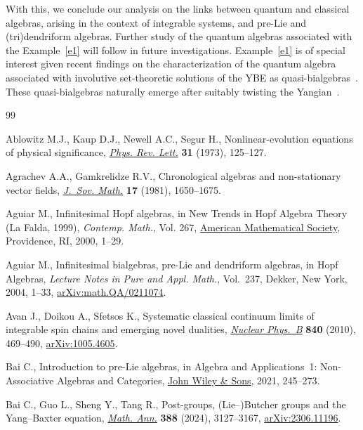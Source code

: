 \documentclass[10pt,a4paper]{amsart}
\numberwithin{equation}{section}
\theoremstyle{definition}
\begin{document}
With this, we conclude our analysis on the links between quantum and classical algebras, arising in the context of integrable systems, and pre-Lie and (tri)dendriform algebras. Further study of the quantum algebras associated with the Example~\ref{e1} will follow in future investigations. Example~\ref{e1} is of special interest given recent findings on the characterization of the quantum algebra associated with involutive set-theoretic solutions of the YBE as quasi-bialgebras~\cite{Doikoutw, DoGhVl}. These quasi-bialgebras naturally emerge after suitably twisting the Yangian~\cite{Doikoutw}.

\begin{thebibliography}{99}
\footnotesize\itemsep=0pt

Ablowitz M.J., Kaup D.J., Newell A.C., Segur H., Nonlinear-evolution equations
 of physical significance,
 \href{https://doi.org/10.1103/PhysRevLett.31.125}{\textit{Phys. Rev. Lett.}}
 \textbf{31} (1973), 125--127.

Agrachev A.A., Gamkrelidze R.V., Chronological algebras and non-stationary
 vector fields, \href{https://doi.org/10.1007/BF01084595}{\textit{J.~Sov.
 Math.}} \textbf{17} (1981), 1650--1675.

Aguiar M., Infinitesimal {H}opf algebras, in New Trends in {H}opf Algebra
 Theory ({L}a {F}alda, 1999), \textit{Contemp. Math.}, Vol. 267,
 \href{https://doi.org/10.1090/conm/267/04262}{American Mathematical Society},
 Providence, RI, 2000, 1--29.

Aguiar M., Infinitesimal bialgebras, pre-{L}ie and dendriform algebras, in Hopf
 Algebras, \textit{Lecture Notes in Pure and Appl. Math.}, Vol.~237, Dekker,
 New York, 2004, 1--33,
 \href{http://arxiv.org/abs/math.QA/0211074}{arXiv:math.QA/0211074}.

Avan J., Doikou A., Sfetsos K., Systematic classical continuum limits of
 integrable spin chains and emerging novel dualities,
 \href{https://doi.org/10.1016/j.nuclphysb.2010.07.014}{\textit{Nuclear
 Phys.~B}} \textbf{840} (2010), 469--490,
 \href{http://arxiv.org/abs/1005.4605}{arXiv:1005.4605}.

Bai C., Introduction to pre-{L}ie algebras, in Algebra and Applications~1:
 Non-Associative Algebras and Categories,
 \href{https://doi.org/10.1002/9781119818175.ch7}{John Wiley \& Sons}, 2021,
 245--273.

Bai C., Guo L., Sheng Y., Tang R., Post-groups, ({L}ie--){B}utcher groups and
 the {Y}ang--{B}axter equation,
 \href{https://doi.org/10.1007/s00208-023-02592-z}{\textit{Math. Ann.}}
 \textbf{388} (2024), 3127--3167,
 \href{http://arxiv.org/abs/2306.11196}{arXiv:2306.11196}.


\end{thebibliography}
\end{document}
